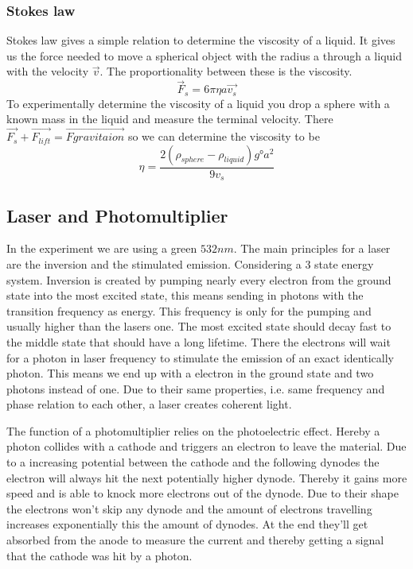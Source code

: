 \documentclass[]{article}
\begin{document}
\subsubsection{Stokes law}
Stokes law gives a simple relation to determine the viscosity of a liquid. It gives us the force needed to move a spherical object with the radius a through a liquid with the velocity $\vec{v}$. The proportionality between these is the viscosity.
\begin{equation}\label{eq:Stokes}
	\vec{F}_s=6 \pi \eta a \vec{v_s}
\end{equation}
To experimentally determine the viscosity of a liquid you drop a sphere with a known mass in the liquid and measure the terminal velocity. There $\vec{F_s}+\vec{F_{lift}}=\vec{F{gravitaion}}$ so we can determine the viscosity to be
\begin{equation}
	\eta=\frac{2(\rho_{sphere}-\rho_{liquid})g ° a^2}{9v_s}
\end{equation} 

\subsection{Laser and Photomultiplier}
In the experiment we are using a green $532nm$. The main principles for a laser are the inversion and the stimulated emission. Considering a 3 state energy system. Inversion is created by pumping nearly every electron from the ground state into the most excited state, this means sending in photons with the transition frequency as energy. This frequency is only for the pumping and usually higher than the lasers one. The most excited state should decay fast to the middle state that should have a long lifetime. There the electrons will wait for a photon in laser frequency to stimulate the emission of an exact identically photon. This means we end up with a electron in the ground state and two photons instead of one. Due to their same properties, i.e. same frequency and phase relation to each other, a laser creates coherent light.

The function of a photomultiplier relies on the photoelectric effect. Hereby a photon collides with a cathode and triggers an electron to leave the material.
Due to a increasing potential between the cathode and the following dynodes the electron will always hit the next potentially higher dynode. Thereby it gains more speed and is able to knock more electrons out of the dynode. Due to their shape the electrons won't skip any dynode and the amount of electrons travelling increases exponentially this the amount of dynodes. At the end they'll get absorbed from the anode to measure the current and thereby getting a signal that the cathode was hit by a photon.
\end{document}
